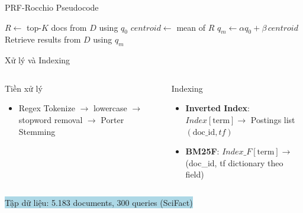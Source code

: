 \documentclass[10pt,aspectratio=169]{beamer}
\begin{document}
\begin{frame}{PRF-Rocchio Pseudocode}
\scriptsize
\begin{tcolorbox}[colback=lightblue,colframe=ptitblue,boxrule=0.4pt,title=PRF-Rocchio Algorithm (Pseudocode)]
\vspace{-1em}
\begin{algorithm}[H]
\begin{algorithmic}[1]
\State $R \leftarrow$ top-$K$ docs from $D$ using $q_0$
\State $centroid \leftarrow$ mean of $R$
\State $q_m \leftarrow \alpha q_0 + \beta\, centroid$
\State \Return Retrieve results from $D$ using $q_m$
\end{algorithmic}
\end{algorithm}
\end{tcolorbox}
\normalsize
\end{frame}

\begin{frame}{Xử lý và Indexing}
\vspace{-1em}
\begin{columns}[T,onlytextwidth]
\begin{block}{Tiền xử lý}
\begin{itemize}
    \item Regex Tokenize $\rightarrow$ lowercase $\rightarrow$ stopword removal $\rightarrow$ Porter Stemming
\end{itemize}
\end{block}

\begin{block}{Indexing}
\begin{itemize}
    \item \textbf{Inverted Index}: $Index[\text{term}] \rightarrow$ Postings list $(\text{doc\_id}, tf)$
    \item \textbf{BM25F}: $Index\_F[\text{term}] \rightarrow$ (doc\_id, tf dictionary theo field)
\end{itemize}
\end{block}
\end{columns}

\vspace{0.7em}
\vspace{-0.2em}
\centering
\footnotesize
\colorbox{lightblue}{Tập dữ liệu: 5.183 documents, 300 queries (SciFact)}
\end{frame}
\end{document}
